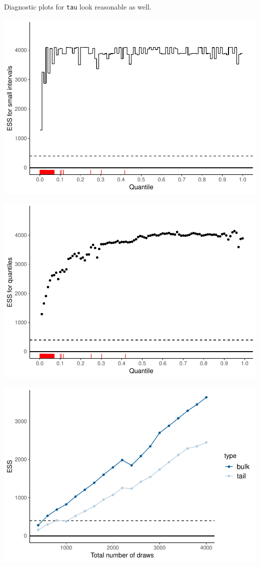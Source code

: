 \documentclass[american,]{article}
\begin{document}
Diagnostic plots for \texttt{tau} look reasonable as well.

\includegraphics{graphics/local-ess-fit-cp4-tau-1.pdf}

\includegraphics{graphics/quantile-ess-fit-cp4-tau-1.pdf}

\includegraphics{graphics/change-ess-fit-cp4-tau-1.pdf}
\end{document}
